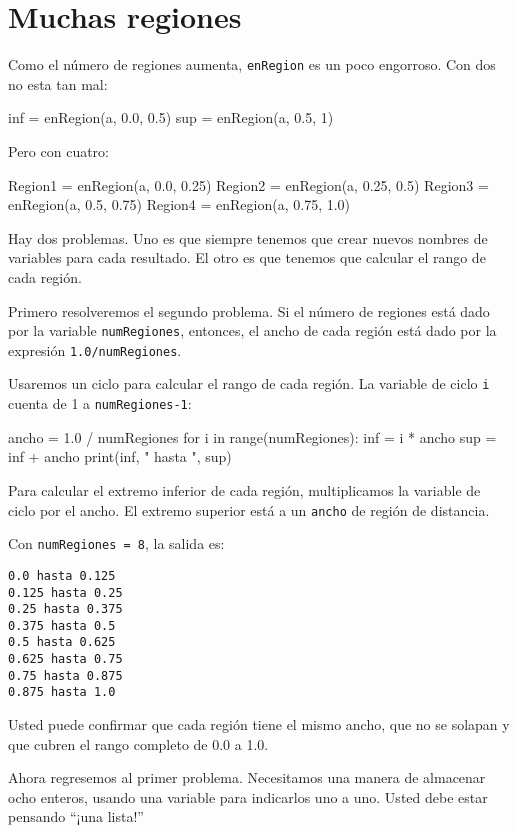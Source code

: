 \section{Muchas regiones}

\label{muchasregiones}

Como el número de regiones aumenta, \texttt{enRegion} es un poco engorroso.
Con dos no esta tan mal:
\begin{pythoncode}
inf = enRegion(a, 0.0, 0.5)
sup = enRegion(a, 0.5, 1)
\end{pythoncode}
 Pero con cuatro:
\begin{pythoncode}
Region1 = enRegion(a, 0.0, 0.25)
Region2 = enRegion(a, 0.25, 0.5)
Region3 = enRegion(a, 0.5, 0.75)
Region4 = enRegion(a, 0.75, 1.0)
\end{pythoncode}

Hay dos problemas. Uno es que siempre tenemos que crear nuevos nombres
de variables para cada resultado. El otro es que tenemos que calcular
el rango de cada región.

Primero resolveremos el segundo problema. Si el número de regiones
está dado por la variable \texttt{numRegiones}, entonces, el ancho
de cada región está dado por la expresión \texttt{1.0/numRegiones}.

Usaremos un ciclo para calcular el rango de cada región. La variable
de ciclo \texttt{i} cuenta de 1 a \texttt{numRegiones-1}:
\begin{pythoncode}
ancho = 1.0 / numRegiones
for i in range(numRegiones):
  inf = i * ancho
  sup = inf + ancho
  print(inf, " hasta ", sup)
\end{pythoncode}

Para calcular el extremo inferior de cada región, multiplicamos la
variable de ciclo por el ancho. El extremo superior está a un \texttt{ancho}
de región de distancia.

Con \texttt{numRegiones = 8}, la salida es:
\begin{verbatim}
0.0 hasta 0.125
0.125 hasta 0.25
0.25 hasta 0.375
0.375 hasta 0.5
0.5 hasta 0.625
0.625 hasta 0.75
0.75 hasta 0.875
0.875 hasta 1.0
\end{verbatim}
Usted puede confirmar que cada región tiene el mismo ancho, que no
se solapan y que cubren el rango completo de 0.0 a 1.0.

Ahora regresemos al primer problema. Necesitamos una manera de almacenar
ocho enteros, usando una variable para indicarlos uno a uno. Usted
debe estar pensando ``¡una lista!''

